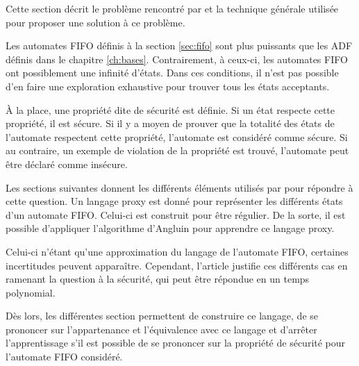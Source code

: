 Cette section décrit le problème rencontré par \cite{Vardhan04} et la technique générale utilisée pour proposer une solution à ce problème.

Les automates FIFO définis à la section \ref{sec:fifo} sont plus puissants que les ADF définis dans le chapitre \ref{ch:bases}. Contrairement, à ceux-ci, les automates FIFO ont possiblement une infinité d'états. Dans ces conditions, il n'est pas possible d'en faire une exploration exhaustive pour trouver tous les états acceptants.

À la place, une propriété dite de sécurité est définie. Si un état respecte cette propriété, il est sécure. Si il y a moyen de prouver que la totalité des états de l'automate respectent cette propriété, l'automate est considéré comme sécure. Si au contraire, un exemple de violation de la propriété est trouvé, l'automate peut être déclaré comme insécure.

Les sections suivantes donnent les différents éléments utilisés par \cite{Vardhan04} pour répondre à cette question. Un langage proxy est donné pour représenter les différents états d'un automate FIFO. Celui-ci est construit pour être régulier. De la sorte, il est possible d'appliquer l'algorithme d'Angluin pour apprendre ce langage proxy.

Celui-ci n'étant qu'une approximation du langage de l'automate FIFO, certaines incertitudes peuvent apparaître. Cependant, l'article justifie ces différents cas en ramenant la question à la sécurité, qui peut être répondue en un temps polynomial.

Dès lors, les différentes section permettent de construire ce langage, de se prononcer sur l'appartenance et l'équivalence avec ce langage et d'arrêter l'apprentissage s'il est possible de se prononcer sur la propriété de sécurité pour l'automate FIFO considéré.
